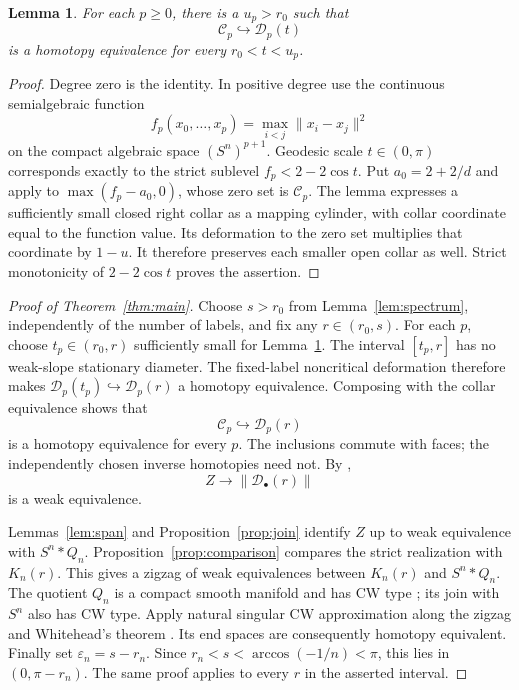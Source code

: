 \documentclass[11pt,a4paper]{article}
\newtheorem{lemma}[theorem]{Lemma}
\theoremstyle{definition}
\newcommand{\fat}[1]{\lVert #1\rVert}
\newcommand{\Dconf}{\mathcal D}
\newcommand{\Cconf}{\mathcal C}
\begin{document}
\begin{lemma}\label{lem:collar}
For each \(p\geq0\), there is a \(u_p>r_0\) such that
\[
\Cconf_p\hookrightarrow\Dconf_p(t)
\]
is a homotopy equivalence for every \(r_0<t<u_p\).
\end{lemma}
\begin{proof}
Degree zero is the identity. In positive degree use the continuous semialgebraic function
\[
f_p(x_0,\ldots,x_p)=\max_{i<j}\|x_i-x_j\|^2
\]
on the compact algebraic space \((S^n)^{p+1}\).
Geodesic scale \(t\in(0,\pi)\) corresponds exactly to the strict sublevel
\(f_p<2-2\cos t\).
Put \(a_0=2+2/d\) and apply \cite[Lemma~4.3]{JM} to
\(\max(f_p-a_0,0)\), whose zero set is \(\Cconf_p\).
The lemma expresses a sufficiently small closed right collar as a mapping cylinder, with collar coordinate equal to the function value. Its deformation to the zero set multiplies that coordinate by \(1-u\). It therefore preserves each smaller open collar as well. Strict monotonicity of \(2-2\cos t\) proves the assertion.
\end{proof}

\begin{proof}[Proof of Theorem~\ref{thm:main}]
Choose \(s>r_0\) from Lemma~\ref{lem:spectrum}, independently of the number of labels, and fix any \(r\in(r_0,s)\).
For each \(p\), choose \(t_p\in(r_0,r)\) sufficiently small for Lemma~\ref{lem:collar}.
The interval \([t_p,r]\) has no weak-slope stationary diameter. The fixed-label noncritical deformation \cite[Proposition~2.5]{MW} therefore makes
\(\Dconf_p(t_p)\hookrightarrow\Dconf_p(r)\) a homotopy equivalence. Composing with the collar equivalence shows that
\[
\Cconf_p\hookrightarrow\Dconf_p(r)
\]
is a homotopy equivalence for every \(p\).
The inclusions commute with faces; the independently chosen inverse homotopies need not. By \cite[Theorem~2.2]{ERW},
\[
Z\longrightarrow\fat{\Dconf_\bullet(r)}
\]
is a weak equivalence.

Lemmas~\ref{lem:span} and Proposition~\ref{prop:join} identify \(Z\) up to weak equivalence with \(S^n*Q_n\). Proposition~\ref{prop:comparison} compares the strict realization with \(K_n(r)\). This gives a zigzag of weak equivalences between \(K_n(r)\) and \(S^n*Q_n\).
The quotient \(Q_n\) is a compact smooth manifold and has CW type \cite[Corollary~A.12]{Hat}; its join with \(S^n\) also has CW type. Apply natural singular CW approximation \cite[Lemma~1.11]{ERW} along the zigzag and Whitehead's theorem \cite[Theorem~4.5]{Hat}. Its end spaces are consequently homotopy equivalent.
Finally set \(\varepsilon_n=s-r_n\). Since \(r_n<s<\arccos(-1/n)<\pi\), this lies in \((0,\pi-r_n)\). The same proof applies to every \(r\) in the asserted interval.
\end{proof}
\end{document}
